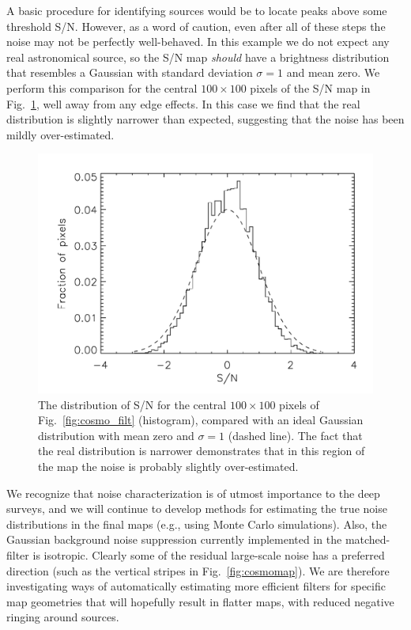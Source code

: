 \documentclass[twoside,11pt]{article}
\renewcommand{\_}{\texttt{\symbol{95}}}
\begin{document}
A basic procedure for identifying sources would be to locate peaks
above some threshold S/N. However, as a word of caution, even after
all of these steps the noise may not be perfectly well-behaved. In
this example we do not expect any real astronomical source, so the S/N
map {\em should\/} have a brightness distribution that resembles a
Gaussian with standard deviation $\sigma=1$ and mean zero. We perform
this comparison for the central $100 \times 100$ pixels of the S/N map
in Fig.~\ref{fig:cosmo_snrcompare}, well away from any edge
effects. In this case we find that the real distribution is slightly
narrower than expected, suggesting that the noise has been mildly
over-estimated.

\begin{figure}
\begin{center}
\includegraphics[width=0.8\linewidth]{sc19_cosmo_snrcompare}
\caption{The distribution of S/N for the central $100 \times 100$
  pixels of Fig.~\ref{fig:cosmo_filt} (histogram), compared with an
  ideal Gaussian distribution with mean zero and $\sigma=1$ (dashed
  line). The fact that the real distribution is narrower demonstrates
  that in this region of the map the noise is probably slightly
  over-estimated.}
\label{fig:cosmo_snrcompare}
\end{center}
\end{figure}

We recognize that noise characterization is of utmost importance to
the deep surveys, and we will continue to develop methods for
estimating the true noise distributions in the final maps (e.g., using
Monte Carlo simulations). Also, the Gaussian background noise
suppression currently implemented in the matched-filter is
isotropic. Clearly some of the residual large-scale noise has a
preferred direction (such as the vertical stripes in
Fig.~\ref{fig:cosmomap}). We are therefore investigating ways of
automatically estimating more efficient filters for specific map
geometries that will hopefully result in flatter maps, with reduced
negative ringing around sources.
\end{document}

